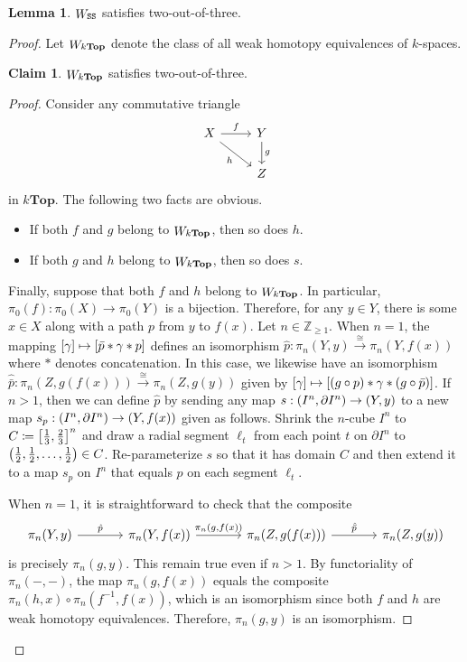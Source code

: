 \documentclass[10pt,letterpaper,cm]{nupset}
\theoremstyle{definition}
\theoremstyle{theorem}
\newtheorem{lemma}[definition]{Lemma}
\newtheorem*{claim}{Claim}
\theoremstyle{remark}
\newcommand{\Z}{\mathbb Z}
\newcommand{\0}{\mathbf{0}}
\newcommand{\1}{\mathbf{1}}
\newcommand{\2}{\mathbf{2}}
\DeclareMathOperator{\we}{\mathnormal{W}}
\newcommand{\bi}{\begin{itemize}}
\newcommand{\ei}{\end{itemize}}
\begin{document}
\smallskip

\begin{lemma}\label{SS23}
$\we_{\mathtt{SS}}$ satisfies two-out-of-three.
\end{lemma}
\begin{proof}
Let $\we_{k\mathbf{Top}}$ denote the class of all weak homotopy equivalences of $k$-spaces.
\begin{claim} 
 $\we_{k\mathbf{Top}}$ satisfies  two-out-of-three.
\end{claim}
\begin{proof} 
Consider any commutative triangle
\[
\begin{tikzcd}
X \arrow[r, "f"] \arrow[rd, "h"'] & Y \arrow[d, "g"] \\
                                  & Z               
\end{tikzcd}
\] in $k\mathbf{Top}$. 
The following two facts are obvious.
\bi
\item If both $f$ and $g$ belong to $\we_{k\mathbf{Top}}$, then so does $h$. 
\item If both $g$ and $h$ belong to $\we_{k\mathbf{Top}}$, then so does $s$. 
\ei
Finally, suppose that both $f$ and $h$ belong to $\we_{k\mathbf{Top}}$. In particular, $\pi_0(f) : \pi_0(X) \to \pi_0(Y)$ is a bijection. Therefore, for any $y\in Y$, there is some $x\in X$ along with a path $p$ from $y$ to $f(x)$. Let $n\in \Z_{\geq 1}$. When $n=1$, the mapping $\mleft[\gamma\mright] \mapsto \mleft[\bar{p}\ast \gamma \ast p\mright]$ defines an isomorphism $\hat{p} : \pi_n(Y, y) \overset{\cong}{\longrightarrow} \pi_n(Y, f(x))$ where $\ast$ denotes concatenation. In this case, we likewise have an isomorphism $\hat{\bar{p}} : \pi_n(Z, g(f(x))) \overset{\cong}{\longrightarrow} \pi_n(Z, g(y))$ given by $\mleft[\gamma\mright] \mapsto \mleft[\mleft(g\circ {p}\mright)\ast \gamma \ast \mleft( g \circ \bar{p}\mright)\mright]$. If $n>1$, then we can define $\hat{p}$ by sending any map $s: \mleft(I^n, \partial{I^n}\mright) \to \mleft(Y, y\mright)$ to a new map $s_p : \mleft(I^n, \partial{I^n}\mright) \to \mleft(Y, f(x)\mright)$ given as follows. Shrink the $n$-cube $I^n$ to  $C\coloneqq \mleft[\frac{1}{3}, \frac{2}{3}\mright]^n$ and draw a radial segment $\ell_t$ from each point $t$ on $\partial{I^n}$ to $\mleft(\frac{1}{2}, \frac{1}{2}, \ldots, \frac{1}{2}\mright)\in C$. Re-parameterize  $s$ so that it has domain $C$ and then extend it to a map $s_p$ on $I^n$ that equals $p$ on each segment $\ell_t$.

\medskip

When $n=1$, it is straightforward to check that the composite
\[
\begin{tikzcd}[column sep=large]
{\pi_n(Y,y)} \arrow[r, "\hat{p}"] & {\pi_n(Y, f(x))} \arrow[r, "{\pi_n(g, f(x))}"] & {\pi_n(Z, g(f(x)))} \arrow[r, "\hat{\bar{p}}"] & {\pi_n(Z, g(y))}
\end{tikzcd}
\] is precisely $\pi_n(g,y)$. This remain true even if $n>1$.
By functoriality of $\pi_n({-}, {-})$, the map $\pi_n(g,f(x))$ equals the composite $\pi_n(h, x) \circ \pi_n(f^{-1}, f(x))$, which is an isomorphism since both $f$ and $h$ are weak homotopy equivalences. Therefore, $\pi_n(g,y)$ is an isomorphism.


\end{proof}
\end{proof}
\end{document}
